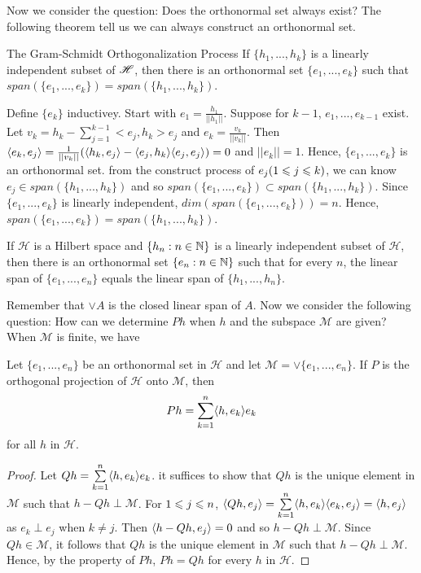Now we consider the question: Does the orthonormal set always exist? The following theorem tell us we can always construct an orthonormal set.

\begin{theorem}{The Gram-Schmidt Orthogonalization Process}{}
    If $\{h_1,...,h_k\}$ is a linearly independent subset of $\mathscr{H}$, 
    then there is an orthonormal set $\{e_1,...,e_k\}$ such that $span(\{e_1,...,e_k\})= span(\{h_1,...,h_k\})$.
\end{theorem}
\begin{proofsolution}
    Define $\{e_k\}$ inductivey. Start with $e_1=\frac{h_1}{||h_1||}$. 
    Suppose for $k-1$, $e_1,...,e_{k-1}$ exist. Let $v_k = h_k-\sum\limits_{j=1}^{k-1}<e_j,h_k>e_j$ and $e_k = \frac{v_k}{||v_k||}$.
    Then $\langle e_k,e_j\rangle=\frac{1}{||v_k||}(\langle h_k,e_j\rangle-\langle e_j,h_k\rangle\langle e_j,e_j\rangle)=0$ and $||e_k||=1$.
    Hence, $\{e_1,...,e_k\}$ is an orthonormal set. 
    from the construct process of $e_j(1\leqslant j \leqslant k)$, we can know $e_j\in span(\{h_1,...,h_k\})$ and so $span(\{e_1,...,e_k\})\subset span(\{h_1,...,h_k\})$. 
    Since $\{e_1,...,e_k\}$ is linearly independent, $dim(span(\{e_1,...,e_k\}))=n$. Hence, $span(\{e_1,...,e_k\})= span(\{h_1,...,h_k\})$.
\end{proofsolution}

\begin{proposition}{}{}
    If $\mathscr{H}$ is a Hilbert space and $\{h_n:n\in \mathbb{N}\}$ is a linearly independent subset of $\mathscr{H}$,
    then there is an orthonormal set $\{e_n:n\in\mathbb{N}\}$ such that for every $n$, the linear span of $\{e_1,...,e_n\}$ equals the linear span of $\{h_1,...,h_n\}$.
\end{proposition}


Remember that $\vee A$ is the closed linear span of $A$.
Now we consider the following question: How can we determine $Ph$ when $h$ and the subspace
$\mathscr{M}$ are given? When $\mathscr{M}$ is finite, we have

\begin{proposition}{}{}
    Let $\{e_1,...,e_n\}$ be an orthonormal set in $\mathscr{H}$ and let $\mathscr{M}=\vee \{e_1,...,e_n\}$.
    If $P$ is the orthogonal projection of $\mathscr{H}$ onto $\mathscr{M}$, then 
    \begin{align*}
        Ph=\sum\limits_{k=1}^{n}\langle h,e_k\rangle e_k
    \end{align*}
    for all $h$ in $\mathscr{H}$.
\end{proposition}
\begin{proof}
    Let $Qh=\sum\limits_{k=1}^{n}\langle h,e_k\rangle e_k$.
    it suffices to show that $Qh$ is the unique element in $\mathscr{M}$ such that $h-Qh\perp \mathscr{M}$.
    For $1\leqslant j\leqslant n$, $\langle Qh,e_j\rangle=\sum\limits_{k=1}^{n}\langle h,e_k\rangle\langle e_k,e_j\rangle=\langle h,e_j\rangle$ as $e_k\perp e_j$ when $k\neq j$.
    Then $\langle h-Qh,e_j\rangle=0$ and so $h-Qh\perp \mathscr{M}$. Since $Qh\in \mathscr{M}$, it follows that $Qh$ is the unique element in $\mathscr{M}$
    such that $h-Qh\perp \mathscr{M}$. Hence, by the property of $Ph$, $Ph=Qh$ for every $h$ in $\mathscr{H}$.
\end{proof}

